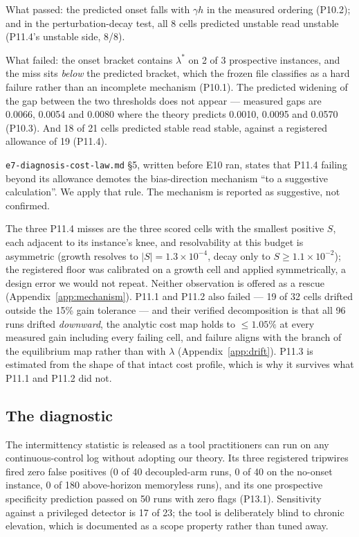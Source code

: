 What passed: the predicted onset falls with \(\gamma h\) in the measured
ordering (P10.2); and in the perturbation-decay test, all 8 cells
predicted unstable read unstable (P11.4's unstable side, 8/8).

What failed: the onset bracket contains \(\lambda^\ast\) on 2 of 3
prospective instances, and the miss sits \emph{below} the predicted
bracket, which the frozen file classifies as a hard failure rather than
an incomplete mechanism (P10.1). The predicted widening of the gap
between the two thresholds does not appear --- measured gaps are 0.0066,
0.0054 and 0.0080 where the theory predicts 0.0010, 0.0095 and 0.0570
(P10.3). And 18 of 21 cells predicted stable read stable, against a
registered allowance of 19 (P11.4).

\texttt{e7-diagnosis-cost-law.md} \S5, written before E10 ran, states
that P11.4 failing beyond its allowance demotes the bias-direction
mechanism ``to a suggestive calculation''. We apply that rule. The
mechanism is reported as suggestive, not confirmed.

The three P11.4 misses are the three scored cells with the smallest positive
$S$, each adjacent to its instance's knee, and resolvability at this budget is
asymmetric (growth resolves to $|S|=1.3\times10^{-4}$, decay only to
$S\ge1.1\times10^{-2}$); the registered floor was calibrated on a growth cell
and applied symmetrically, a design error we would not repeat. Neither
observation is offered as a rescue (Appendix~\ref{app:mechanism}). P11.1 and
P11.2 also failed --- 19 of 32 cells drifted outside the 15\% gain tolerance
--- and their verified decomposition is that all 96 runs drifted
\emph{downward}, the analytic cost map holds to $\le1.05\%$ at every measured
gain including every failing cell, and failure aligns with the branch of the
equilibrium map rather than with $\lambda$ (Appendix~\ref{app:drift}). P11.3
is estimated from the shape of that intact cost profile, which is why it
survives what P11.1 and P11.2 did not.

\subsection{The diagnostic}
\label{sec:diagnostic}

The intermittency statistic is released as a tool practitioners can run
on any continuous-control log without adopting our theory. Its three
registered tripwires fired zero false positives (0 of 40 decoupled-arm
runs, 0 of 40 on the no-onset instance, 0 of 180 above-horizon
memoryless runs), and its one prospective specificity prediction passed
on 50 runs with zero flags (P13.1). Sensitivity against a privileged
detector is 17 of 23; the tool is deliberately blind to chronic
elevation, which is documented as a scope property rather than tuned
away.

